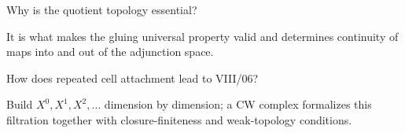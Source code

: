\begin{problem}\label{prob:viii05-23}
Why is the quotient topology essential?
\end{problem}
\begin{solution}
It is what makes the gluing universal property valid and determines continuity of maps into and out of the adjunction space.
\end{solution}

\begin{problem}\label{prob:viii05-24}
How does repeated cell attachment lead to VIII/06?
\end{problem}
\begin{solution}
Build \(X^0,X^1,X^2,\ldots\) dimension by dimension; a CW complex formalizes this filtration together with closure-finiteness and weak-topology conditions.
\end{solution}
